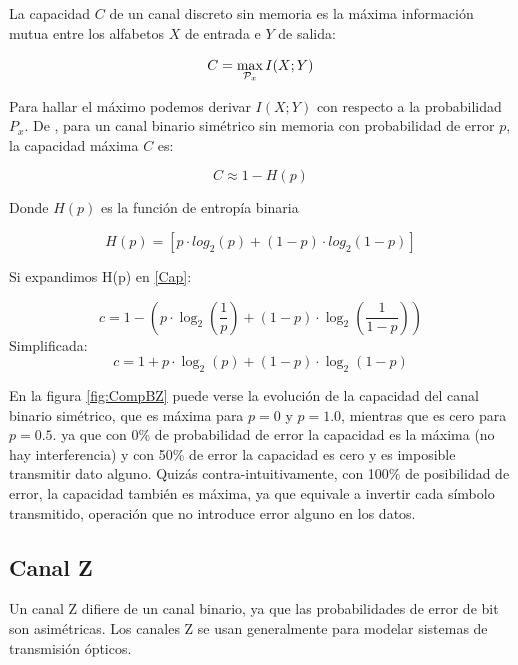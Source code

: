 La capacidad $C$ de un canal discreto sin memoria es la máxima información mutua entre los alfabetos $X$ de entrada e $Y$ de salida:

\begin{equation}
C = \max_{{\cal{P}}_x} I(X;Y) 
\end{equation}

Para hallar el máximo podemos derivar $I(X;Y)$ con respecto a la probabilidad $P_x$.
De \cite{MacKay:2002}, para un canal binario simétrico sin memoria con probabilidad de error $p$, la capacidad máxima $C$ es:

\begin{equation}\label{Cap}
C \approx 1 - H(p) 
\end{equation}

Donde $H(p)$ es la función de entropía binaria

\begin{equation}\label{Hp}
 H(p) = [p \cdot log_2(p) + (1-p)\cdot log_2 (1-p)]
\end{equation}

Si expandimos H(p) en \ref{Cap}:

$$ c = 1-\left(p \cdot \log_2\left(\frac{1}{p}\right) + (1-p) \cdot \log_2\left(\frac{1}{1-p}\right)\right) $$
Simplificada:
$$ c = 1 + p \cdot \log_2(p) + (1 - p) \cdot \log_2(1-p) $$

En la figura \ref{fig:CompBZ} puede verse la evolución de la capacidad del canal binario simétrico, que es máxima para $p=0$ y $p=1.0$, mientras que es cero para $p=0.5$. ya que con 0\% de probabilidad de error la capacidad es la máxima (no hay interferencia) y con 50\% de error la capacidad es cero y es imposible transmitir dato alguno. Quizás contra-intuitivamente, con 100\% de posibilidad de error, la capacidad también es máxima, ya que equivale a invertir cada símbolo transmitido, operación que no introduce error alguno en los datos.


\subsection{Canal Z}
\label{canalZ}
Un canal Z difiere de un canal binario, ya que las probabilidades de error de bit son asimétricas.
Los canales Z se usan generalmente para modelar sistemas de transmisión ópticos.

